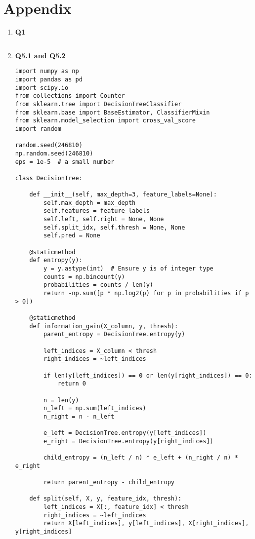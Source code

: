 \documentclass{article}
\newcommand{\Question}[1]{\Large \section{ #1 } \normalsize}
\begin{document}
\Question{Appendix}
\begin{enumerate}
    \item 
    \textbf{Q1}
    \begin{verbatim}
    \end{verbatim}\newpage
    

    \item 
    \textbf{Q5.1 and Q5.2}
    \begin{verbatim}
import numpy as np
import pandas as pd
import scipy.io
from collections import Counter
from sklearn.tree import DecisionTreeClassifier
from sklearn.base import BaseEstimator, ClassifierMixin
from sklearn.model_selection import cross_val_score
import random

random.seed(246810)
np.random.seed(246810)
eps = 1e-5  # a small number

class DecisionTree:

    def __init__(self, max_depth=3, feature_labels=None):
        self.max_depth = max_depth
        self.features = feature_labels
        self.left, self.right = None, None
        self.split_idx, self.thresh = None, None
        self.pred = None

    @staticmethod
    def entropy(y):
        y = y.astype(int)  # Ensure y is of integer type
        counts = np.bincount(y)
        probabilities = counts / len(y)
        return -np.sum([p * np.log2(p) for p in probabilities if p > 0])

    @staticmethod
    def information_gain(X_column, y, thresh):
        parent_entropy = DecisionTree.entropy(y)

        left_indices = X_column < thresh
        right_indices = ~left_indices

        if len(y[left_indices]) == 0 or len(y[right_indices]) == 0:
            return 0

        n = len(y)
        n_left = np.sum(left_indices)
        n_right = n - n_left

        e_left = DecisionTree.entropy(y[left_indices])
        e_right = DecisionTree.entropy(y[right_indices])

        child_entropy = (n_left / n) * e_left + (n_right / n) * e_right

        return parent_entropy - child_entropy

    def split(self, X, y, feature_idx, thresh):
        left_indices = X[:, feature_idx] < thresh
        right_indices = ~left_indices
        return X[left_indices], y[left_indices], X[right_indices], y[right_indices]


\end{verbatim}
\end{enumerate}
\end{document}
